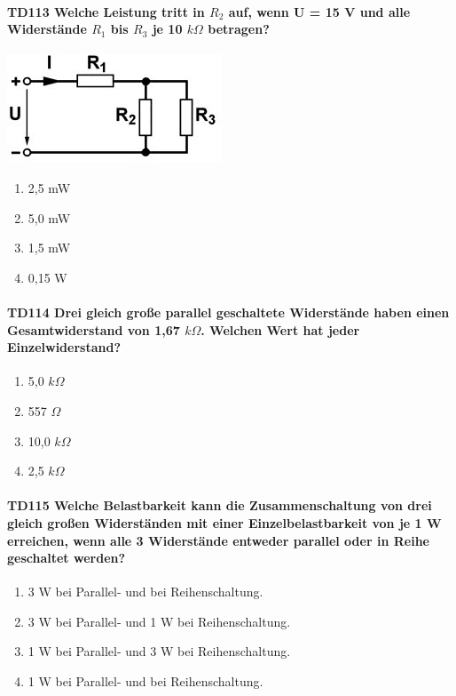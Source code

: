\documentclass[8pt]{article}
\begin{document}
\begin{enumerate}
\begin{enumerate}[nolistsep,label=\Alph*]
\paragraph*{TD113 Welche Leistung tritt in $R_{2}$ auf, wenn U = 15 V und alle Widerstände $R_{1}$ bis $R_{3}$ je 10 $k\Omega$ betragen?}
\begin{center}
	\begin{minipage}{\linewidth}
		\centering
		\includegraphics[scale=1.0]{pics/td113_a.jpg}
	\end{minipage}
\end{center}
\begin{enumerate}[nolistsep,label=\Alph*]
\item 2,5 mW
\item 5,0 mW
\item 1,5 mW
\item 0,15 W
\end{enumerate}

\paragraph*{TD114 Drei gleich große parallel geschaltete Widerstände haben einen Gesamtwiderstand von 1,67 $k\Omega$. Welchen Wert hat jeder Einzelwiderstand?}
\begin{enumerate}[nolistsep,label=\Alph*]
\item 5,0 $k\Omega$
\item 557 $\Omega$
\item 10,0 $k\Omega$
\item 2,5 $k\Omega$
\end{enumerate}

\paragraph*{TD115 Welche Belastbarkeit kann die Zusammenschaltung von drei gleich großen Widerständen mit einer Einzelbelastbarkeit von je 1 W erreichen, wenn alle 3 Widerstände entweder parallel oder in Reihe geschaltet werden?}
\begin{enumerate}[nolistsep,label=\Alph*]
\item 3 W bei Parallel- und bei Reihenschaltung.
\item 3 W bei Parallel- und 1 W bei Reihenschaltung.
\item 1 W bei Parallel- und 3 W bei Reihenschaltung.
\item 1 W bei Parallel- und bei Reihenschaltung.
\end{enumerate}


\end{enumerate}
\end{enumerate}
\end{document}
